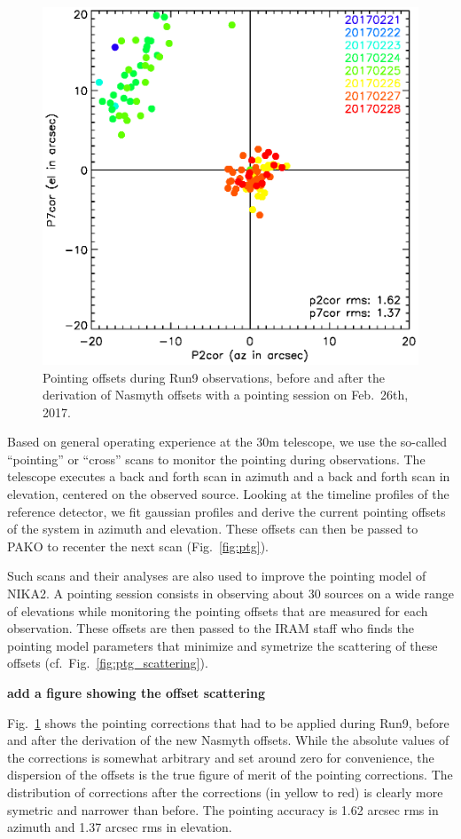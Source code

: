 \begin{figure}
\begin{center}
\includegraphics[clip, angle=0, scale = 0.70]{Figures/pointing_stats_N2R9.eps}
\caption{Pointing offsets during Run9 observations, before and after the
  derivation of Nasmyth offsets with a pointing session on Feb.~26th, 2017.}
\label{fig:pointing_stats_n2r9}
\end{center}
\end{figure}

Based on general operating experience at the 30m telescope, we use the so-called
``pointing'' or ``cross'' scans to monitor the pointing during observations. The
telescope executes a back and forth scan in azimuth and a back and forth scan in
elevation, centered on the observed source. Looking at the timeline profiles of
the reference detector, we fit gaussian profiles and derive the current pointing
offsets of the system in azimuth and elevation. These offsets can then be passed
to PAKO to recenter the next scan (Fig.~\ref{fig:ptg}).

Such scans and their analyses are also used to improve the pointing model
of NIKA2. A pointing session consists in observing about 30 sources on a wide
range of elevations while monitoring the pointing offsets that are measured for
each observation. These offsets are then passed to the IRAM staff who finds
the pointing model parameters that minimize and symetrize the scattering of
these offsets
(cf.~Fig.~\ref{fig:ptg_scattering}).

{\bf add a figure showing the offset scattering}

Fig.~\ref{fig:pointing_stats_n2r9} shows
the pointing corrections that had to be applied during Run9, before and after
the derivation of the new Nasmyth offsets. While the absolute values of the
corrections is somewhat arbitrary and set around zero for convenience, the
dispersion of the offsets is the true figure of merit of the pointing
corrections. The distribution of corrections after the corrections (in yellow to
red) is clearly more symetric and narrower than before. The pointing accuracy is
1.62 arcsec rms in azimuth and 1.37 arcsec rms in elevation.
